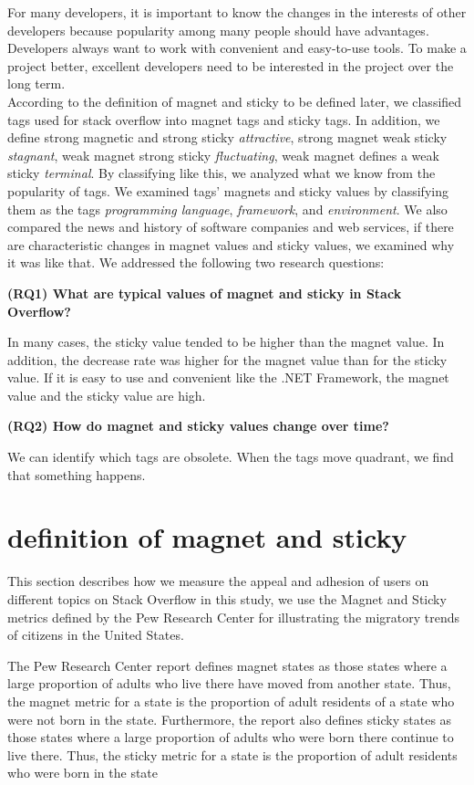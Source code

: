 \documentclass[english,preprint,JIP]{ipsj}
\begin{document}
\smallskip
For many developers, it is important to know the changes in the interests of other developers because popularity among many people should have advantages. Developers always want to work with convenient and easy-to-use tools. To make a project better, excellent developers need to be interested in the project over the long term.\\

According to the definition of magnet and sticky to be defined later, we classified tags used for stack overflow into magnet tags and sticky tags. In addition, we define strong magnetic and strong sticky \emph{attractive}, strong magnet weak sticky \emph{stagnant}, weak magnet strong sticky \emph{fluctuating}, weak magnet defines a weak sticky \emph{terminal}. By classifying like this, we analyzed what we know from the popularity of tags. We examined tags' magnets and sticky values by classifying them as the tags \emph{programming language}, \emph{framework}, and \emph{environment}. We also compared the news and history of software companies and web services, if there are characteristic changes in magnet values and sticky values, we examined why it was like that. We addressed the following two research questions:
\par
\smallskip

\textbf{(RQ1) What are typical values of magnet and sticky in Stack Overflow?}\par
In many cases, the sticky value tended to be higher than the magnet value. In addition, the decrease rate was higher for the magnet value than for the sticky value. If it is easy to use and convenient like the .NET Framework, the magnet value and the sticky value are high.
\smallskip

\textbf{(RQ2) How do magnet and sticky values change over time?}\par
We can identify which tags are obsolete. When the tags move quadrant, we find that something happens.



\section{definition of magnet and sticky}
This section describes how we measure the appeal and adhesion of users on different topics on Stack Overflow in this study, we use the Magnet and Sticky metrics defined by the Pew Research Center for illustrating the migratory trends of citizens in the United States.

The Pew Research Center report defines magnet states as those states where a large proportion of adults who live there have moved from another state. Thus, the magnet metric for a state is the proportion of adult residents of a state who were not born in the state. Furthermore, the report also defines sticky states as those states where a large proportion of adults who were born there continue to live there. Thus, the sticky metric for a state is the proportion of adult residents who were born in the state
\end{document}
